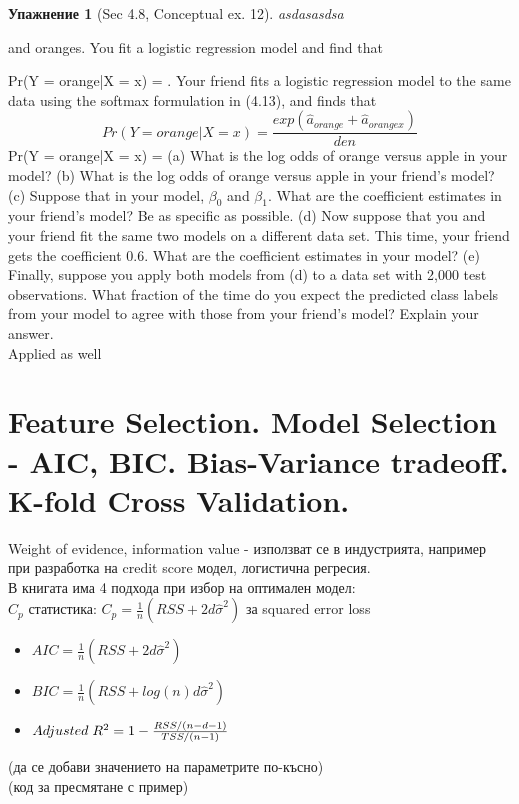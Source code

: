 \documentclass{article}
\newtheorem{exercise}[subsubsection]{Упажнение}
\begin{document}
	\begin{exercise}[Sec 4.8, Conceptual ex. 12]
	asdasasdsa
	\end{exercise}


	and oranges. You fit a logistic regression model and find that
	
	Pr(Y = orange|X = x) =
	.
	Your friend fits a logistic regression model to the same data using the
	softmax formulation in (4.13), and finds that
	$$Pr(Y= orange| X=x) = \frac{exp(\hat{a}_{orange} + \hat{a}_{orangex}) }{den}$$
	Pr(Y = orange|X = x) =
	(a) What is the log odds of orange versus apple in your model?
	(b) What is the log odds of orange versus apple in your friend’s
	model?
	(c) Suppose that in your model, $\beta_0$ and $\beta_1$. What are
	the coefficient estimates in your friend’s model? Be as specific
	as possible.
	(d) Now suppose that you and your friend fit the same two models
	on a different data set. This time, your friend gets the coefficient
	0.6. What are the coefficient estimates in your model?
	(e) Finally, suppose you apply both models from (d) to a data set
	with 2,000 test observations. What fraction of the time do you
	expect the predicted class labels from your model to agree with
	those from your friend’s model? Explain your answer. \\
	
	Applied as well \\
	
	\newpage
	\section{Feature Selection. Model Selection - AIC, BIC. Bias-Variance tradeoff. K-fold Cross Validation.} 
	Weight of evidence, information value - използват се в индустрията, например при разработка на credit score модел, логистична регресия. \\
	В книгата има 4 подхода при избор на оптимален модел: \\
	$C_p$ статистика: $C_p = \frac{1}{n}(RSS + 2d \hat \sigma^2)$ за squared error loss
	\begin{itemize}
		\item $AIC = \frac{1}{n}(RSS + 2d \hat \sigma^2)$
		\item $BIC = \frac{1}{n}(RSS + log(n) d \hat \sigma^2)$
		\item $Adjusted \hspace{0.1cm} R^2 = 1 - \frac{RSS/(n-d-1)}{TSS/(n-1)} $
	\end{itemize}
	(да се добави значението на параметрите по-късно) \\
	(код за пресмятане с пример) \\
	
\end{document}
